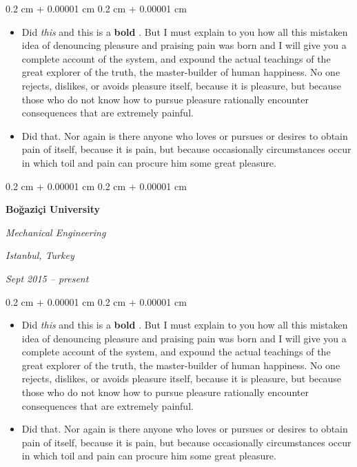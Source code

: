 \documentclass[10pt, letterpaper]{article}
\newenvironment{highlights}{
    \begin{itemize}[
        topsep=0.10 cm,
        parsep=0.10 cm,
        partopsep=0pt,
        itemsep=0pt,
        leftmargin=0.4 cm + 10pt
    ]
}{
    \end{itemize}
} %
\newenvironment{onecolentry}{
    \begin{adjustwidth}{
        0.2 cm + 0.00001 cm
    }{
        0.2 cm + 0.00001 cm
    }
}{
    \end{adjustwidth}
} %
\newenvironment{twocolentry}[2][]{
    \onecolentry
    \def\secondColumn{#2}
    \setcolumnwidth{\fill, 4.5 cm}
    \begin{paracol}{2}
}{
    \switchcolumn \raggedleft \secondColumn
    \end{paracol}
    \endonecolentry
} %
\let\hrefWithoutArrow\href
\renewcommand{\href}[2]{\hrefWithoutArrow{#1}{\ifthenelse{\equal{#2}{}}{ }{#2 }\raisebox{.15ex}{\footnotesize \faExternalLink*}}}
\begin{document}
        \vspace{0.10 cm}
        \begin{onecolentry}
            \begin{highlights}
                \item Did \textit{this} and this is a \textbf{bold} \href{https://example.com}{link}. But I must explain to you how all this mistaken idea of denouncing pleasure and praising pain was born and I will give you a complete account of the system, and expound the actual teachings of the great explorer of the truth, the master-builder of human happiness. No one rejects, dislikes, or avoids pleasure itself, because it is pleasure, but because those who do not know how to pursue pleasure rationally encounter consequences that are extremely painful.
                \item Did that. Nor again is there anyone who loves or pursues or desires to obtain pain of itself, because it is pain, but because occasionally circumstances occur in which toil and pain can procure him some great pleasure.
            \end{highlights}
        \end{onecolentry}


        \vspace{0.2 cm}

        \begin{twocolentry}{
        \textit{Istanbul, Turkey}    
            
        \textit{Sept 2015 – present}}
            \textbf{Boğaziçi University}

            \textit{Mechanical Engineering}
        \end{twocolentry}

        \vspace{0.10 cm}
        \begin{onecolentry}
            \begin{highlights}
                \item Did \textit{this} and this is a \textbf{bold} \href{https://example.com}{link}. But I must explain to you how all this mistaken idea of denouncing pleasure and praising pain was born and I will give you a complete account of the system, and expound the actual teachings of the great explorer of the truth, the master-builder of human happiness. No one rejects, dislikes, or avoids pleasure itself, because it is pleasure, but because those who do not know how to pursue pleasure rationally encounter consequences that are extremely painful.
                \item Did that. Nor again is there anyone who loves or pursues or desires to obtain pain of itself, because it is pain, but because occasionally circumstances occur in which toil and pain can procure him some great pleasure.
            \end{highlights}
        \end{onecolentry}
\end{document}

